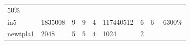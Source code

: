 \documentclass[italian,]{book}
\begin{document}
\begin{longtable}[]{@{}lllllllll@{}}
\begin{minipage}[t]{0.07\columnwidth}
50\%\strut
\end{minipage}\tabularnewline
\begin{minipage}[t]{0.07\columnwidth}\raggedright
in5\strut
\end{minipage} & \begin{minipage}[t]{0.11\columnwidth}\raggedright
1835008\strut
\end{minipage} & \begin{minipage}[t]{0.08\columnwidth}\raggedright
9\strut
\end{minipage} & \begin{minipage}[t]{0.07\columnwidth}\raggedright
9\strut
\end{minipage} & \begin{minipage}[t]{0.09\columnwidth}\raggedright
4\strut
\end{minipage} & \begin{minipage}[t]{0.12\columnwidth}\raggedright
117440512\strut
\end{minipage} & \begin{minipage}[t]{0.08\columnwidth}\raggedright
6\strut
\end{minipage} & \begin{minipage}[t]{0.07\columnwidth}\raggedright
6\strut
\end{minipage} & \begin{minipage}[t]{0.07\columnwidth}\raggedright
-6300\%\strut
\end{minipage}\tabularnewline
\begin{minipage}[t]{0.07\columnwidth}\raggedright
newtpla1\strut
\end{minipage} & \begin{minipage}[t]{0.11\columnwidth}\raggedright
2048\strut
\end{minipage} & \begin{minipage}[t]{0.08\columnwidth}\raggedright
5\strut
\end{minipage} & \begin{minipage}[t]{0.07\columnwidth}\raggedright
5\strut
\end{minipage} & \begin{minipage}[t]{0.09\columnwidth}\raggedright
4\strut
\end{minipage} & \begin{minipage}[t]{0.12\columnwidth}\raggedright
1024\strut
\end{minipage} & \begin{minipage}[t]{0.08\columnwidth}\raggedright
2\strut
\end{minipage} & \begin{minipage}[t]{0.07\columnwidth}\raggedright

\end{minipage}
\end{longtable}
\end{document}
